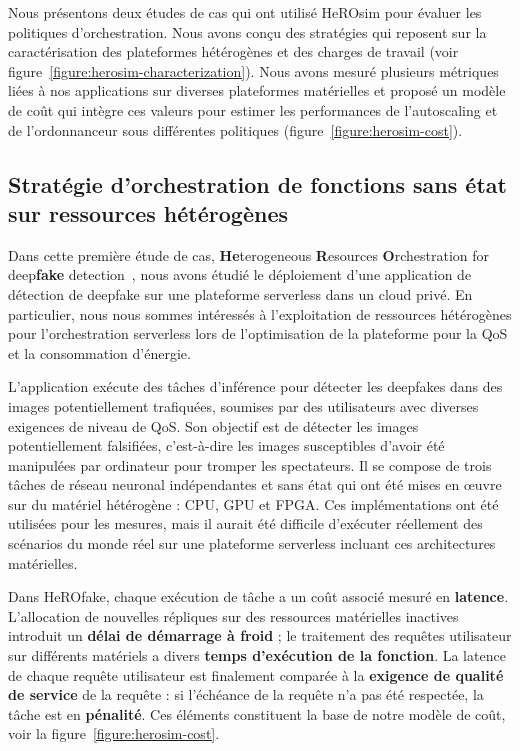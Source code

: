 Nous présentons deux études de cas qui ont utilisé HeROsim pour évaluer les politiques d'orchestration.
Nous avons conçu des stratégies qui reposent sur la caractérisation des plateformes hétérogènes et des charges de travail (voir figure~\ref{figure:herosim-characterization}). Nous avons mesuré plusieurs métriques liées à nos applications sur diverses plateformes matérielles et proposé un modèle de coût qui intègre ces valeurs pour estimer les performances de l'autoscaling et de l'ordonnanceur sous différentes politiques (figure~\ref{figure:herosim-cost}).

\subsection{Stratégie d'orchestration de fonctions sans état sur ressources hétérogènes}

Dans cette première étude de cas, \textbf{He}terogeneous \textbf{R}esources \textbf{O}rchestration for deep\textbf{fake} detection~\cite{herofake}, nous avons étudié le déploiement d'une application de détection de deepfake sur une plateforme serverless dans un cloud privé. En particulier, nous nous sommes intéressés à l'exploitation de ressources hétérogènes pour l'orchestration serverless lors de l'optimisation de la plateforme pour la QoS et la consommation d'énergie.

L'application exécute des tâches d'inférence pour détecter les deepfakes dans des images potentiellement trafiquées, soumises par des utilisateurs avec diverses exigences de niveau de QoS. Son objectif est de détecter les images potentiellement falsifiées, c'est-à-dire les images susceptibles d'avoir été manipulées par ordinateur pour tromper les spectateurs. Il se compose de trois tâches de réseau neuronal indépendantes et sans état qui ont été mises en œuvre sur du matériel hétérogène : CPU, GPU et FPGA. Ces implémentations ont été utilisées pour les mesures, mais il aurait été difficile d'exécuter réellement des scénarios du monde réel sur une plateforme serverless incluant ces architectures matérielles.

Dans HeROfake, chaque exécution de tâche a un coût associé mesuré en \textbf{latence}. L'allocation de nouvelles répliques sur des ressources matérielles inactives introduit un \textbf{délai de démarrage à froid} ; le traitement des requêtes utilisateur sur différents matériels a divers \textbf{temps d'exécution de la fonction}. La latence de chaque requête utilisateur est finalement comparée à la \textbf{exigence de qualité de service} de la requête : si l'échéance de la requête n'a pas été respectée, la tâche est en \textbf{pénalité}. Ces éléments constituent la base de notre modèle de coût, voir la figure~\ref{figure:herosim-cost}.

